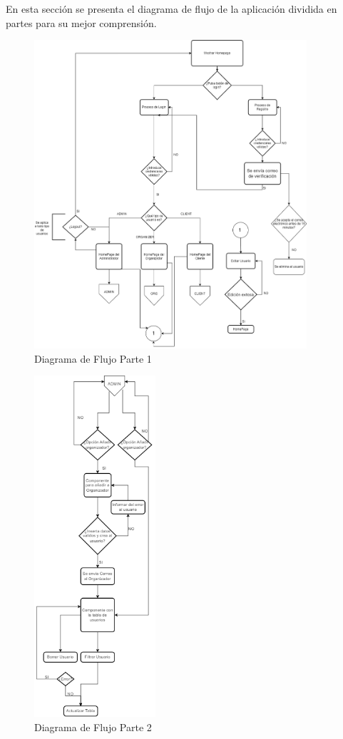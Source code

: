 En esta sección se presenta el diagrama de flujo de la aplicación dividida en partes para su mejor comprensión.
\begin{figure}[h]
    \centering
    \includegraphics[width=0.9\textwidth]{FlujoGeneral.png} 
    \caption{Diagrama de Flujo Parte 1}
    \label{fig:flujoEvs}
\end{figure}
\newpage
\begin{figure}[h]
    \centering
    \includegraphics[width=0.4\textwidth]{AdminFlujo.png} 
    \caption{Diagrama de Flujo Parte 2}
    \label{fig:flujoEvs1}
\end{figure}
